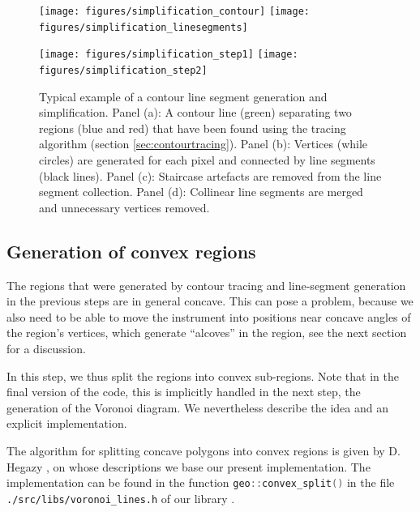 \begin{figure}
	\texttt{[image: figures/simplification\_contour]}
	\hspace{0.1cm}
	\texttt{[image: figures/simplification\_linesegments]}

	\vspace{0.25cm}

	\texttt{[image: figures/simplification\_step1]}
	\hspace{0.1cm}
	\texttt{[image: figures/simplification\_step2]}
	\caption[Contour line segment generation.]{
		Typical example of a contour line segment generation and simplification.
		Panel (a): A contour line (green) separating two regions (blue and red) that have been found using 
			the tracing algorithm (section \ref{sec:contourtracing}).
		Panel (b): Vertices (while circles) are generated for each pixel and connected by line 
			segments (black lines).
		Panel (c): Staircase artefacts are removed from the line segment collection.
		Panel (d): Collinear line segments are merged and unnecessary vertices removed.
		\label{fig:contour_simplification}}
\end{figure}



\subsection{Generation of convex regions}
\label{sec:convex_regions}
The regions that were generated by contour tracing and line-segment generation in the previous steps are in general concave.
This can pose a problem, because we also need to be able to move the instrument into positions near concave angles
of the region's vertices, which generate ``alcoves'' in the region, see the next section for a discussion.

In this step, we thus split the regions into convex sub-regions. 
Note that in the final version of the code, this is implicitly handled in the next step, the generation of 
the Voronoi diagram. We nevertheless describe the idea and an explicit implementation.

The algorithm for splitting concave polygons into convex regions is given by D. Hegazy \cite{Hegazy2014},
on whose descriptions we base our present implementation.
The implementation can be found in the function \lstinline[language=C++]|geo::convex_split()| in the file
\lstinline|./src/libs/voronoi_lines.h| of our library .

